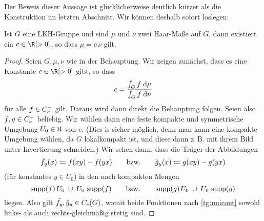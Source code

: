 
\bigskip
\noindent
Der Beweis dieser Aussage ist glücklicherweise deutlich kürzer als die
Konstruktion im letzten Abschnitt. Wir können deshalb sofort loslegen: 

\begin{thSatz}
    Ist $G$ eine LKH-Gruppe und sind $\mu$ und $\nu$ zwei Haar-Maße auf $G$,
    dann existiert ein $c\in\R[>0]$, so dass $\mu = c\,\nu$ gilt.
\end{thSatz}

\begin{proof}
    Seien $G,\mu,\nu$ wie in der Behauptung. Wir zeigen zunächst, dass es eine
    Konstante $c\in\R[>0]$ gibt, so dass
    \[ c = \frac{\int_G f \;\mathrm{d} \mu}{\int_G f \;\mathrm{d} \nu} \]
    für alle $f\in C_c^+$ gilt. Daraus wird dann direkt die Behauptung
    folgen. Seien also $f,g\in C_c^+$ beliebig. Wir wählen dann eine
    feste kompakte und symmetrische Umgebung $U_0\in\mathfrak{U}$ von $e$. (Dies is
    sicher möglich, denn man kann eine kompakte Umgebung wählen, da $G$
    lokalkompakt ist, und diese dann z.\,B. mit ihrem Bild unter Invertierung
    schneiden.) Wir sehen dann, dass die Träger der Abbildungen
    \[  \tilde f_y(x) \coloneqq f(xy)-f(yx) \qquad\text{bzw.}\qquad 
        \tilde g_y(x) \coloneqq g(xy)-g(yx) 
    \]
    (für konstantes $y\in U_0$) in den nach 
    kompakten Mengen
    \[  \operatorname{supp}(f)\,U_0 \;\cup\; U_0\,\operatorname{supp}(f)  \qquad\text{bzw.}\qquad
        \operatorname{supp}(g)\,U_0 \;\cup\; U_0\,\operatorname{supp}(g)
    \]
    liegen. Also gilt $\tilde f_y, \tilde g_y \in C_c(G)$, womit beide
    Funktionen nach \cref{tg:unicont} sowohl links- als auch rechts-gleichmäßig
    stetig sind.
\end{proof}


















